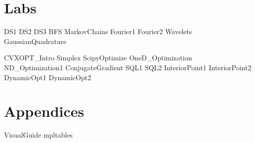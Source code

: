 \documentclass[nociteref]{SIAM-GH-book}
\begin{document}
\setcounter{tocdepth}{1}
\tableofcontents

\mainmatter %

\part{Labs}
{DS1}
{DS2}
{DS3}
{BFS}
{MarkovChains}
{Fourier1}
{Fourier2}
{Wavelets}
{GaussianQuadrature}

{CVXOPT_Intro}
{Simplex}
{ScipyOptimize}
{OneD_Optimization}
{ND_Optimization1}
{ConjugateGradient} %
{SQL1}
{SQL2}
{InteriorPoint1}
{InteriorPoint2}
{DynamicOpt1}
{DynamicOpt2}

\part{Appendices}
\begin{appendices}
{VisualGuide}
{mpltables}
\end{appendices}
\end{document}
